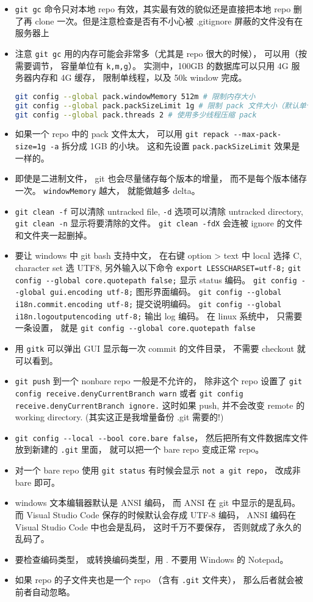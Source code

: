 \begin{itemize}
\item \verb`git gc` 命令只对本地 repo 有效，其实最有效的貌似还是直接把本地 repo 删了再 clone 一次。但是注意检查是否有不小心被 .gitignore 屏蔽的文件没有在服务器上
\item 注意 \verb`git gc` 用的内存可能会非常多（尤其是 repo 很大的时候）， 可以用（按需要调节， 容量单位有 \verb`k,m,g`）。 实测中，100GB 的数据库可以只用 4G 服务器内存和 4G 缓存， 限制单线程，以及 50k window 完成。
\begin{lstlisting}[language=bash]
git config --global pack.windowMemory 512m # 限制内存大小
git config --global pack.packSizeLimit 1g # 限制 pack 文件大小（默认单个文件）
git config --global pack.threads 2 # 使用多少线程压缩 pack
\end{lstlisting}
\item 如果一个 repo 中的 pack 文件太大， 可以用 \verb`git repack --max-pack-size=1g -a` 拆分成 1GB 的小块。 这和先设置 \verb`pack.packSizeLimit` 效果是一样的。
\item 即使是二进制文件， git 也会尽量储存每个版本的增量， 而不是每个版本储存一次。 \verb`windowMemory` 越大， 就能做越多 delta。
\item \verb`git clean -f` 可以清除 untracked file, \verb`-d` 选项可以清除 untracked directory,  \verb`git clean -n` 显示将要清除的文件。 \verb`git clean -fdX` 会连被 ignore 的文件和文件夹一起删掉。
\item 要让 windows 中 git bash 支持中文， 在右键 option > text 中 local 选择 C, character set 选 UTF8, 另外输入以下命令
\verb`export LESSCHARSET=utf-8;` \verb`git config --global core.quotepath false;`     显示 status 编码。
\verb`git config --global gui.encoding utf-8;`    图形界面编码。
\verb`git config --global i18n.commit.encoding utf-8;`   提交说明编码。
\verb`git config --global i18n.logoutputencoding utf-8;` 输出 log 编码。
在 linux 系统中， 只需要一条设置， 就是
\verb`git config --global core.quotepath false`
\item 用 \verb`gitk` 可以弹出 GUI 显示每一次 commit 的文件目录， 不需要 checkout 就可以看到。
\item \verb`git push` 到一个 nonbare repo 一般是不允许的， 除非这个 repo 设置了 \verb`git config receive.denyCurrentBranch warn` 或者 \verb`git config receive.denyCurrentBranch ignore.` 这时如果 push, 并不会改变 remote 的 working directory. (其实这正是我增量备份 .git 需要的!)
\item \verb`git config --local --bool core.bare false`， 然后把所有文件数据库文件放到新建的 \verb`.git` 里面， 就可以把一个 bare repo 变成正常 repo。
\item 对一个 bare repo 使用 \verb`git status` 有时候会显示 \verb`not a git repo`， 改成非 bare 即可。
\item windows 文本编辑器默认是 ANSI 编码， 而 ANSI 在 git 中显示的是乱码。 而 Visual Studio Code 保存的时候默认会存成 UTF-8 编码， ANSI 编码在 Visual Studio Code 中也会是乱码， 这时千万不要保存， 否则就成了永久的乱码了。
\item 要检查编码类型， 或转换编码类型，用 . 不要用 Windows 的 Notepad。
\item 如果 repo 的子文件夹也是一个 repo （含有 \verb`.git` 文件夹）， 那么后者就会被前者自动忽略。
\end{itemize}

